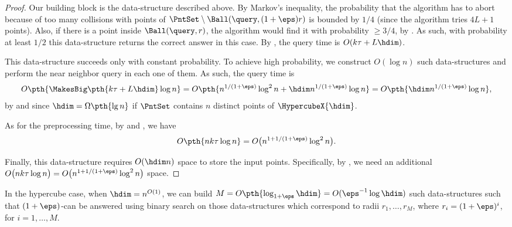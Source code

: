\begin{proof}
    Our building block is the data-structure described above.  By
    Markov's inequality, the probability that the algorithm has to
    abort because of too many collisions with points of $\PntSet
    \setminus \Ball(\query,(1+\eps)r)$ is bounded by $1/4$ (since the
    algorithm tries $4L + 1$ points). Also, if there is a point inside
    $\Ball(\query,r)$, the algorithm would find it with probability
    $\geq 3/4$, by . As such, with probability at
    least $1/2$ this data-structure returns the correct answer in this
    case.  By , the query time is $O( k \tau +
    L \hdim )$.

    This data-structure succeeds only with constant probability. To
    achieve high probability, we construct $O( \log n)$ such
    data-structures and perform the near neighbor query in each one of
    them.  As such, the query time is
    \begin{align*}
        O\pth{ \MakesBig \pth{ k \tau + L \hdim} \log n }%
        =%
        O\pth{n^{1/(1+\eps)} \log^2 n + \hdim n^{1/(1+\eps)} \log n}%
        =%
        O \pth{ \hdim n^{1/(1+\eps)} \log n},
    \end{align*}
    by  and since $\hdim = \Omega\pth{\lg n
    }$ if $\PntSet$ contains $n$ distinct points of
    $\HypercubeX{\hdim}$.

    As for the preprocessing time, by  and
    , we have
    \begin{align*}
        O\pth{ nk\tau \log n } = O\bigl(n^{1+1/(1+\eps)} \log^2 n
        \bigr).
    \end{align*}

    Finally, this data-structure requires $O(\hdim n)$ space to store
    the input points.  Specifically, by , we
    need an additional
    \begin{math}
        O\bigl( nk\tau \log n\bigr)%
        =%
        O\bigl( n^{1+1/(1+\eps)} \log^2 n\bigr)
    \end{math}
    space.
\end{proof}

In the hypercube case, when $\hdim = n^{O(1)}$, we can build $M =
O\pth{\log_{1+\eps} \hdim} = O(\eps^{-1} \log \hdim)$ such
data-structures such that $(1+\eps)$-\ANNbr can be answered using
binary search on those data-structures which correspond to radii
$r_1,\ldots, r_M$, where $r_i =(1+\eps)^i$, for $i=1,\ldots, M$.

